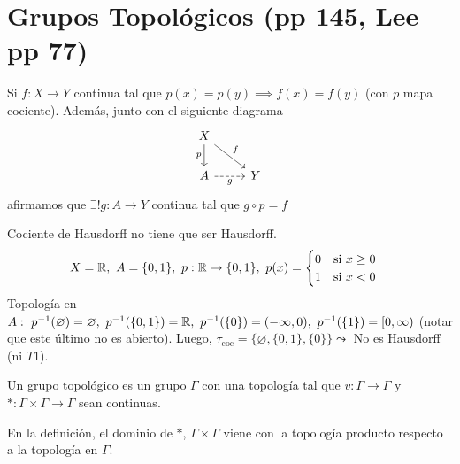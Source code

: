 \section{Grupos Topológicos (pp 145, Lee pp 77)}

\begin{property}
	Si $f:X \to Y$ continua tal que $p(x) = p(y) \implies f(x) = f(y)$ (con $p$ mapa cociente). Además, junto con el siguiente diagrama
	\[
	\begin{tikzcd}
		{X} \arrow[d, "p"'] \arrow[rd, "f"] & \\
		A \arrow[r, dashrightarrow, "g"']                                                 & Y
	\end{tikzcd}
	\]
	afirmamos que $\exists ! g : A \to Y$ continua tal que $g \circ p = f$
\end{property}

\begin{eg}
	Cociente de Hausdorff no tiene que ser Hausdorff.
	\[
	X = \mathbb{R},\ A = \{0,1\},\ p : \mathbb{R} \to \{0,1\},\ p(x) = \begin{cases}
		0 \quad \text{si } x \geq 0 \\
		1 \quad \text{si } x < 0
	\end{cases}
	\]
	Topología en $A:\ p^{-1}(\varnothing) = \varnothing,\ p^{-1}(\{0,1\})=\R,\ p^{-1}(\{0\}) = (-\infty,0),\ p^{-1}(\{1\}) = [0,\infty)$ (notar que este último no es abierto). Luego, $\tau_{\text{coc}} = \{\varnothing, \{0,1\}, \{0\} \} \leadsto$ No es Hausdorff (ni $T1$).
\end{eg}

\begin{definition}
	Un grupo topológico es un grupo $\Gamma$ con una topología tal que $v: \Gamma \to \Gamma$ y $*:\Gamma \times \Gamma \to \Gamma$ sean continuas.
\end{definition}

\begin{observe}
	En la definición, el dominio de $*$, $\Gamma \times \Gamma$ viene con la topología producto respecto a la topología en $\Gamma$.
\end{observe}

